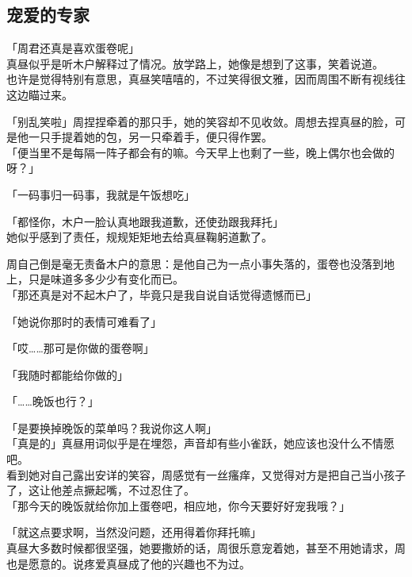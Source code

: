 \subsection{宠爱的专家}

「周君还真是喜欢蛋卷呢」\\

真昼似乎是听木户解释过了情况。放学路上，她像是想到了这事，笑着说道。\\

也许是觉得特别有意思，真昼笑嘻嘻的，不过笑得很文雅，因而周围不断有视线往这边瞄过来。

「别乱笑啦」周捏捏牵着的那只手，她的笑容却不见收敛。周想去捏真昼的脸，可是他一只手提着她的包，另一只牵着手，便只得作罢。\\

「便当里不是每隔一阵子都会有的嘛。今天早上也剩了一些，晚上偶尔也会做的呀？」

「一码事归一码事，我就是午饭想吃」

「都怪你，木户一脸认真地跟我道歉，还使劲跟我拜托」\\

她似乎感到了责任，规规矩矩地去给真昼鞠躬道歉了。

周自己倒是毫无责备木户的意思：是他自己为一点小事失落的，蛋卷也没落到地上，只是味道多多少少有变化而已。\\

「那还真是对不起木户了，毕竟只是我自说自话觉得遗憾而已」

「她说你那时的表情可难看了」

「哎……那可是你做的蛋卷啊」

「我随时都能给你做的」

「……晚饭也行？」

「是要换掉晚饭的菜单吗？我说你这人啊」\\

「真是的」真昼用词似乎是在埋怨，声音却有些小雀跃，她应该也没什么不情愿吧。\\

看到她对自己露出安详的笑容，周感觉有一丝瘙痒，又觉得对方是把自己当小孩子了，这让他差点撅起嘴，不过忍住了。\\

「那今天的晚饭就给你加上蛋卷吧，相应地，你今天要好好宠我哦？」

「就这点要求啊，当然没问题，还用得着你拜托嘛」\\

真昼大多数时候都很坚强，她要撒娇的话，周很乐意宠着她，甚至不用她请求，周也是愿意的。说疼爱真昼成了他的兴趣也不为过。\\

